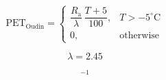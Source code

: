 \documentclass[preview,border=2pt]{standalone}
\begin{document}
\[
\mathrm{PET}_\mathrm{Oudin} = \begin{cases}
    \dfrac{R_\mathrm{a}}{\lambda}\,\dfrac{T+5}{100}, & T>-5^\circ\!\mathrm{C} \\
    0, & \text{otherwise}
  \end{cases}
\]

\[
\lambda=2.45
\]

\[
^{-1}
\]
\end{document}
